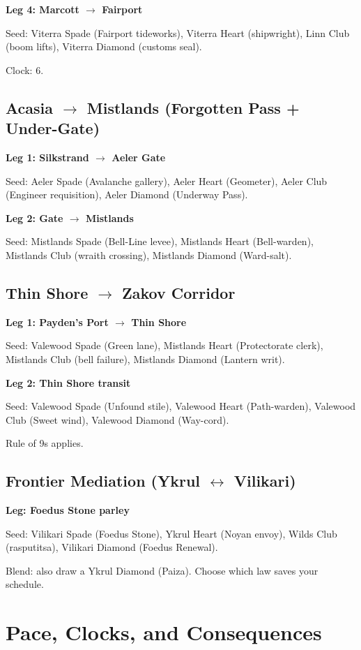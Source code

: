 \textbf{Leg 4: Marcott $\rightarrow$ Fairport}

Seed: Viterra Spade (Fairport tideworks), Viterra Heart (shipwright), Linn Club (boom lifts), Viterra Diamond (customs seal).

Clock: 6.

\subsection{Acasia $\rightarrow$ Mistlands (Forgotten Pass + Under-Gate)}

\textbf{Leg 1: Silkstrand $\rightarrow$ Aeler Gate}

Seed: Aeler Spade (Avalanche gallery), Aeler Heart (Geometer), Aeler Club (Engineer requisition), Aeler Diamond (Underway Pass).

\textbf{Leg 2: Gate $\rightarrow$ Mistlands}

Seed: Mistlands Spade (Bell-Line levee), Mistlands Heart (Bell-warden), Mistlands Club (wraith crossing), Mistlands Diamond (Ward-salt).

\subsection{Thin Shore $\rightarrow$ Zakov Corridor}

\textbf{Leg 1: Payden's Port $\rightarrow$ Thin Shore}

Seed: Valewood Spade (Green lane), Mistlands Heart (Protectorate clerk), Mistlands Club (bell failure), Mistlands Diamond (Lantern writ).

\textbf{Leg 2: Thin Shore transit}

Seed: Valewood Spade (Unfound stile), Valewood Heart (Path-warden), Valewood Club (Sweet wind), Valewood Diamond (Way-cord).

Rule of 9s applies.

\subsection{Frontier Mediation (Ykrul $\leftrightarrow$ Vilikari)}

\textbf{Leg: Foedus Stone parley}

Seed: Vilikari Spade (Foedus Stone), Ykrul Heart (Noyan envoy), Wilds Club (rasputitsa), Vilikari Diamond (Foedus Renewal).

Blend: also draw a Ykrul Diamond (Paiza). Choose which law saves your schedule.

\section{Pace, Clocks, and Consequences}

